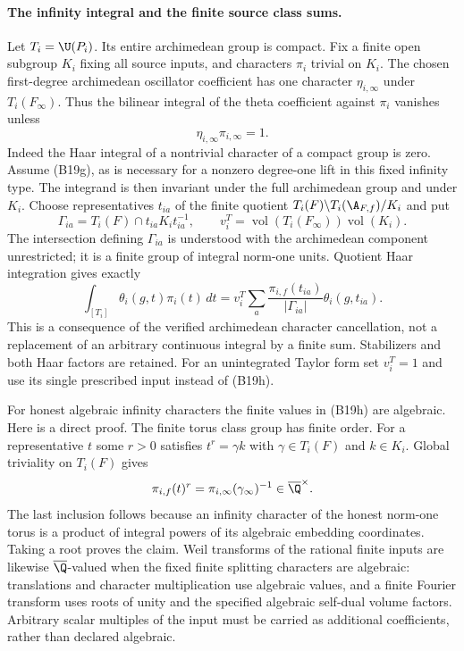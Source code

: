 \paragraph{The infinity integral and the finite source class sums.}
Let $T_i=\U(P_i)$.  Its entire archimedean group is compact.
Fix a finite open subgroup $K_i$ fixing all source inputs, and
characters $\pi_i$ trivial on $K_i$.  The chosen first-degree
archimedean oscillator coefficient has one character
$\eta_{i,\infty}$ under $T_i(F_\infty)$.  Thus the bilinear
integral of the theta coefficient against $\pi_i$ vanishes unless
\[
                    \eta_{i,\infty}\pi_{i,\infty}=1.
 \tag{B19g}
\]
Indeed the Haar integral of a nontrivial character of a compact
group is zero.  Assume (B19g), as is necessary for a nonzero
degree-one lift in this fixed infinity type.  The integrand is
then invariant under the full archimedean group and under $K_i$.
Choose representatives $t_{ia}$ of the finite quotient
$T_i(F)\backslash T_i(\A_{F,f})/K_i$ and put
\[
 \Gamma_{ia}=T_i(F)\cap t_{ia}K_it_{ia}^{-1},\qquad
 v_i^T=\operatorname{vol}(T_i(F_\infty))\operatorname{vol}(K_i).
\]
The intersection defining $\Gamma_{ia}$ is understood with the
archimedean component unrestricted; it is a finite group of
integral norm-one units.  Quotient Haar integration gives exactly
\[
 \int_{[T_i]}\theta_i(g,t)\pi_i(t)\,dt
  =v_i^T\sum_a\frac{\pi_{i,f}(t_{ia})}{|\Gamma_{ia}|}
                      \theta_i(g,t_{ia}).
 \tag{B19h}
\]
This is a consequence of the verified archimedean character
cancellation, not a replacement of an arbitrary continuous
integral by a finite sum.  Stabilizers and both Haar factors are
retained.  For an unintegrated Taylor form set $v_i^T=1$ and
use its single prescribed input instead of (B19h).

For honest algebraic infinity characters the finite values in
(B19h) are algebraic.  Here is a direct proof.  The finite torus
class group has finite order.  For a representative $t$ some
$r>0$ satisfies $t^r=\gamma k$ with
$\gamma\in T_i(F)$ and $k\in K_i$.  Global triviality on
$T_i(F)$ gives
\[
 \pi_{i,f}(t)^r=\pi_{i,\infty}(\gamma_\infty)^{-1}
                      \in\overline\Q^\times.
\]
The last inclusion follows because an infinity character of the
honest norm-one torus is a product of integral powers of its
algebraic embedding coordinates.  Taking a root proves the claim.
Weil transforms of the rational finite inputs are likewise
$\overline\Q$-valued when the fixed finite splitting characters
are algebraic: translations and character multiplication use
algebraic values, and a finite Fourier transform uses roots of
unity and the specified algebraic self-dual volume factors.
Arbitrary scalar multiples of the input must be carried as
additional coefficients, rather than declared algebraic.

